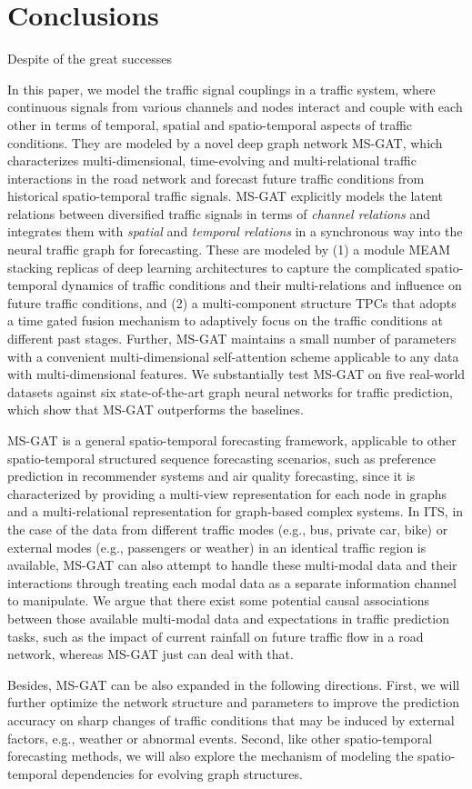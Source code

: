\section{Conclusions}
Despite of the great successes 

In this paper, we model the traffic signal couplings in a traffic system, where continuous signals from various channels and nodes interact and couple with each other in terms of temporal, spatial and spatio-temporal aspects of traffic conditions. They are modeled by a novel deep graph network MS-GAT, which characterizes multi-dimensional, time-evolving and multi-relational traffic interactions in the road network and forecast future traffic conditions from historical spatio-temporal traffic signals. MS-GAT explicitly models the latent relations between diversified traffic signals in terms of \textit{channel relations} and integrates them  with \textit{spatial} and \textit{temporal relations} in a synchronous way into the neural traffic graph for forecasting. These are modeled by (1) a module MEAM stacking replicas of deep learning architectures to capture the complicated spatio-temporal dynamics of traffic conditions and their multi-relations and influence on future traffic conditions, and (2) a multi-component structure TPCs that adopts a time gated fusion mechanism to adaptively focus on the traffic conditions at different past stages. Further, MS-GAT maintains a small number of parameters with a convenient multi-dimensional self-attention scheme applicable to any data with multi-dimensional features. We substantially test MS-GAT on five real-world datasets against six state-of-the-art graph neural networks for traffic prediction, which show that MS-GAT outperforms the baselines. 

MS-GAT is a general spatio-temporal forecasting framework, applicable to other spatio-temporal structured sequence forecasting scenarios, such as preference prediction in recommender systems and air quality forecasting, since it is characterized by providing a multi-view representation for each node in graphs and a multi-relational representation for graph-based complex systems. In ITS, in the case of the data from different traffic modes (e.g., bus, private car, bike) or external modes (e.g., passengers or weather) in an identical traffic region is available, MS-GAT can also attempt to handle these multi-modal data and their interactions through treating each modal data as a separate information channel to manipulate. We argue that there exist some potential causal associations between those available multi-modal data and expectations in traffic prediction tasks, such as the impact of current rainfall on future traffic flow in a road network, whereas MS-GAT just can deal with that. 

Besides, MS-GAT can be also expanded in the following directions. First, we will further optimize the network structure and parameters to improve the prediction accuracy on sharp changes of traffic conditions that may be induced by external factors, e.g., weather or abnormal events. Second, like other spatio-temporal forecasting methods, we will also explore the mechanism of modeling the spatio-temporal dependencies for evolving graph structures.